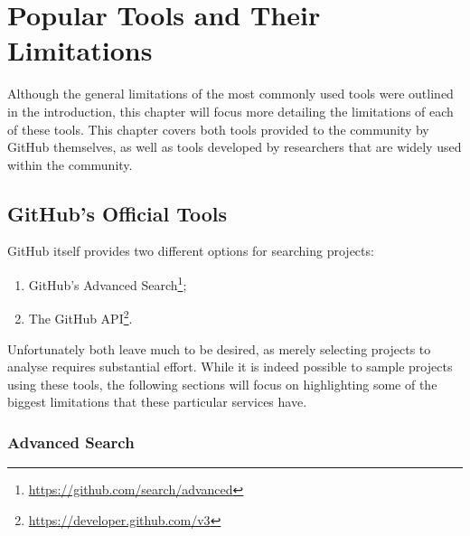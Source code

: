 \chapter{Popular Tools and Their Limitations}\label{ch:2}

Although the general limitations of the most commonly used tools were outlined in the introduction, this chapter will focus more detailing the limitations of each of these tools.
This chapter covers both tools provided to the community by GitHub themselves, as well as tools developed by researchers that are widely used within the community.

\section{GitHub's Official Tools}

GitHub itself provides two different options for searching projects:
\begin{enumerate}
    \item GitHub's Advanced Search\footnote{\url{https://github.com/search/advanced}};
    \item The GitHub API\footnote{\url{https://developer.github.com/v3}}\@.
\end{enumerate}
Unfortunately both leave much to be desired, as merely selecting projects to analyse requires substantial effort.
While it is indeed possible to sample projects using these tools, the following sections will focus on highlighting some of the biggest limitations that these particular services have.

\subsection{Advanced Search}

